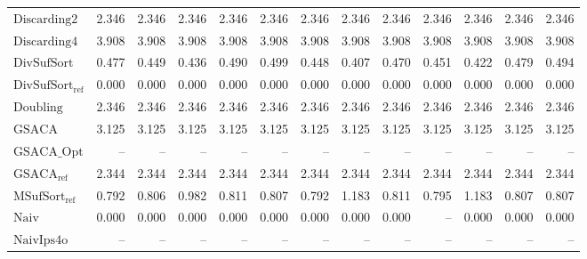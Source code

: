 \begin{table}[h]
{\begin{tabular}{lrrrrrrrrrrrr}
    $\text{Discarding2}$ & 2.346 & 2.346 & 2.346 & 2.346 & 2.346 & 2.346 & 2.346 & 2.346 & 2.346 & 2.346 & 2.346 & 2.346 \\
    $\text{Discarding4}$ & {\color{red}3.908} & {\color{red}3.908} & {\color{red}3.908} & {\color{red}3.908} & {\color{red}3.908} & {\color{red}3.908} & {\color{red}3.908} & {\color{red}3.908} & {\color{red}3.908} & {\color{red}3.908} & {\color{red}3.908} & {\color{red}3.908} \\
    $\text{DivSufSort}$ & 0.477 & 0.449 & 0.436 & 0.490 & 0.499 & 0.448 & 0.407 & 0.470 & 0.451 & 0.422 & 0.479 & 0.494 \\
    $\text{DivSufSort}_{\text{ref}}$ & {\color{green!60!black}0.000} & 0.000 & 0.000 & {\color{green!60!black}0.000} & {\color{green!60!black}0.000} & {\color{green!60!black}0.000} & {\color{green!60!black}0.000} & {\color{green!60!black}0.000} & {\color{green!60!black}0.000} & {\color{green!60!black}0.000} & {\color{green!60!black}0.000} & {\color{green!60!black}0.000} \\
    $\text{Doubling}$ & 2.346 & 2.346 & 2.346 & 2.346 & 2.346 & 2.346 & 2.346 & 2.346 & 2.346 & 2.346 & 2.346 & 2.346 \\
    $\text{GSACA}$ & 3.125 & 3.125 & 3.125 & 3.125 & 3.125 & 3.125 & 3.125 & 3.125 & 3.125 & 3.125 & 3.125 & 3.125 \\
    $\text{GSACA\_Opt}$ & {\color{darkgray}--} & {\color{darkgray}--} & {\color{darkgray}--} & {\color{darkgray}--} & {\color{darkgray}--} & {\color{darkgray}--} & {\color{darkgray}--} & {\color{darkgray}--} & {\color{darkgray}--} & {\color{darkgray}--} & {\color{darkgray}--} & {\color{darkgray}--} \\
    $\text{GSACA}_{\text{ref}}$ & 2.344 & 2.344 & 2.344 & 2.344 & 2.344 & 2.344 & 2.344 & 2.344 & 2.344 & 2.344 & 2.344 & 2.344 \\
    $\text{MSufSort}_{\text{ref}}$ & 0.792 & 0.806 & 0.982 & 0.811 & 0.807 & 0.792 & 1.183 & 0.811 & 0.795 & 1.183 & 0.807 & 0.807 \\
    $\text{Naiv}$ & {\color{green!60!black}0.000} & {\color{green!60!black}0.000} & {\color{green!60!black}0.000} & {\color{green!60!black}0.000} & {\color{green!60!black}0.000} & {\color{green!60!black}0.000} & {\color{green!60!black}0.000} & {\color{green!60!black}0.000} & {\color{darkgray}--} & {\color{green!60!black}0.000} & {\color{green!60!black}0.000} & {\color{green!60!black}0.000} \\
    $\text{NaivIps4o}$ & {\color{darkgray}--} & {\color{darkgray}--} & {\color{darkgray}--} & {\color{darkgray}--} & {\color{darkgray}--} & {\color{darkgray}--} & {\color{darkgray}--} & {\color{darkgray}--} & {\color{darkgray}--} & {\color{darkgray}--} & {\color{darkgray}--} & {\color{darkgray}--} \\

\end{tabular}}
\end{table}
